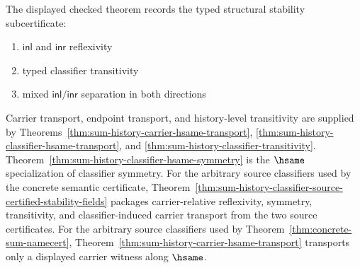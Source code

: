 \begin{definition}
\label{def:sum-stability-certificate}
The displayed checked theorem records the typed structural stability
subcertificate:
\begin{enumerate}
  \item $\mathsf{inl}$ and $\mathsf{inr}$ reflexivity
  \item typed classifier transitivity
  \item mixed $\mathsf{inl}/\mathsf{inr}$ separation in both directions
\end{enumerate}
Carrier transport, endpoint transport, and history-level transitivity are
supplied by Theorems~\ref{thm:sum-history-carrier-hsame-transport},
\ref{thm:sum-history-classifier-hsame-transport}, and
\ref{thm:sum-history-classifier-transitivity}. Theorem~\ref{thm:sum-history-classifier-hsame-symmetry}
is the $\hsame$ specialization of classifier symmetry. For the arbitrary source
classifiers used by the concrete semantic certificate,
Theorem~\ref{thm:sum-history-classifier-source-certified-stability-fields}
packages carrier-relative reflexivity, symmetry, transitivity, and
classifier-induced carrier transport from the two source certificates.
For the arbitrary source classifiers used by Theorem~\ref{thm:concrete-sum-namecert},
Theorem~\ref{thm:sum-history-carrier-hsame-transport} transports only a
displayed carrier witness along $\hsame$.
\end{definition}




